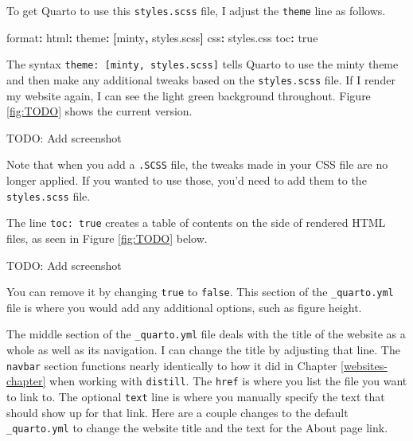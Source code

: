 \documentclass[
]{book}
\newenvironment{Shaded}{\begin{snugshade}}{\end{snugshade}}
\newcommand{\AttributeTok}[1]{\textcolor[rgb]{0.77,0.63,0.00}{#1}}
\newcommand{\CharTok}[1]{\textcolor[rgb]{0.31,0.60,0.02}{#1}}
\newcommand{\FunctionTok}[1]{\textcolor[rgb]{0.00,0.00,0.00}{#1}}
\newcommand{\KeywordTok}[1]{\textcolor[rgb]{0.13,0.29,0.53}{\textbf{#1}}}
\begin{document}
To get Quarto to use this \texttt{styles.scss} file, I adjust the \texttt{theme} line as follows.

\begin{Shaded}
\begin{Highlighting}[]
\FunctionTok{format}\KeywordTok{:}
\AttributeTok{  }\FunctionTok{html}\KeywordTok{:}
\AttributeTok{        }\FunctionTok{theme}\KeywordTok{:}\AttributeTok{ }\KeywordTok{[}\AttributeTok{minty}\KeywordTok{,}\AttributeTok{ styles.scss}\KeywordTok{]}
\AttributeTok{    }\FunctionTok{css}\KeywordTok{:}\AttributeTok{ styles.css}
\AttributeTok{    }\FunctionTok{toc}\KeywordTok{:}\AttributeTok{ }\CharTok{true}
\end{Highlighting}
\end{Shaded}

The syntax \texttt{theme:\ {[}minty,\ styles.scss{]}} tells Quarto to use the minty theme and then make any additional tweaks based on the \texttt{styles.scss} file. If I render my website again, I can see the light green background throughout. Figure \ref{fig:TODO} shows the current version.

TODO: Add screenshot

Note that when you add a \texttt{.SCSS} file, the tweaks made in your CSS file are no longer applied. If you wanted to use those, you'd need to add them to the \texttt{styles.scss} file.

The line \texttt{toc:\ true} creates a table of contents on the side of rendered HTML files, as seen in Figure \ref{fig:TODO} below.

TODO: Add screenshot

You can remove it by changing \texttt{true} to \texttt{false}. This section of the \texttt{\_quarto.yml} file is where you would add any additional options, such as figure height.

The middle section of the \texttt{\_quarto.yml} file deals with the title of the website as a whole as well as its navigation. I can change the title by adjusting that line. The \texttt{navbar} section functions nearly identically to how it did in Chapter \ref{websites-chapter} when working with \texttt{distill}. The \texttt{href} is where you list the file you want to link to. The optional \texttt{text} line is where you manually specify the text that should show up for that link. Here are a couple changes to the default \texttt{\_quarto.yml} to change the website title and the text for the About page link.
\end{document}

